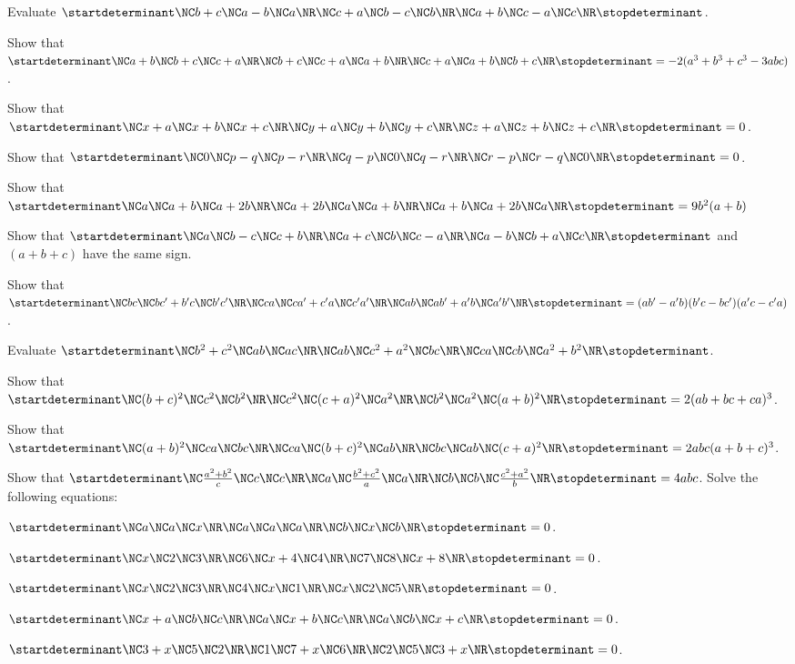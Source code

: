 \item Evaluate $\startdeterminant\NC  b + c \NC a - b \NC a\NR\NC c + a \NC b - c \NC b\NR\NC a + b \NC c - a \NC c\NR\stopdeterminant$.
\item Show that $\startdeterminant\NC  a + b \NC b + c \NC c + a\NR\NC b + c \NC c + a \NC a + b\NR\NC c + a \NC a + b \NC b + c\NR\stopdeterminant = -2(a^3 + b^3 +
  c^3 - 3abc)$.
\item Show that $\startdeterminant\NC  x + a \NC x + b \NC x + c\NR\NC y + a \NC y + b \NC y + c\NR\NC z + a\NC z + b \NC z + c\NR\stopdeterminant = 0$.
\item Show that $\startdeterminant\NC  0 \NC p - q \NC p - r\NR\NC  q - p \NC 0 \NC q - r\NR\NC  r - p \NC r - q \NC 0\NR\stopdeterminant = 0$.
\item Show that $\startdeterminant\NC  a \NC a + b \NC a + 2b\NR\NC a + 2b \NC a \NC a + b\NR\NC a + b \NC a + 2b \NC a\NR\stopdeterminant = 9b^2(a + b)$
\item Show that $\startdeterminant\NC  a \NC b - c \NC c + b\NR\NC  a + c \NC b \NC c - a\NR\NC  a - b \NC b + a \NC c\NR\stopdeterminant$ and $(a + b + c)$ have the
  same sign.
\item Show that $\startdeterminant\NC bc\NC bc' + b'c\NC b'c'\NR\NC ca\NC ca' + c'a \NC c'a'\NR\NC ab\NC ab' + a'b\NC a'b'\NR\stopdeterminant =
  (ab' - a'b)(b'c - bc')(a'c - c'a)$.
\item Evaluate $\startdeterminant\NC  b^2 + c^2 \NC ab \NC ac\NR\NC ab \NC c^2 + a^2 \NC bc\NR\NC ca \NC cb \NC a^2 + b^2\NR\stopdeterminant$.
\item Show that $\startdeterminant\NC  (b + c)^2 \NC c^2 \NC b^2\NR\NC c^2 \NC (c + a)^2 \NC a^2\NR\NC b^2 \NC a^2 \NC (a + b)^2\NR\stopdeterminant = 2(ab + bc +
  ca)^3$.
\item Show that $\startdeterminant\NC  (a + b)^2 \NC ca \NC bc\NR\NC ca \NC (b + c)^2 \NC ab\NR\NC bc \NC ab \NC (c + a)^2\NR\stopdeterminant = 2abc(a + b + c)^3$.
\item Show that $\startdeterminant\NC  \frac{a^2 + b^2}{c} \NC c \NC c\NR\NC a \NC \frac{b^2 + c^2}{a} \NC a\NR\NC b \NC b \NC \frac{c^2 + a^2}{b}\NR\stopdeterminant
  = 4abc$.
\stopitemize
Solve the following equations:

\item $\startdeterminant\NC  a \NC a \NC x \NR\NC  a \NC a \NC a \NR\NC  b \NC x \NC b\NR\stopdeterminant = 0$.
\item $\startdeterminant\NC  x \NC 2 \NC 3\NR\NC 6 \NC x + 4 \NC 4\NR\NC 7 \NC 8 \NC x + 8\NR\stopdeterminant = 0$.
\item $\startdeterminant\NC  x \NC 2 \NC 3\NR\NC  4 \NC x \NC 1\NR\NC  x \NC 2 \NC 5\NR\stopdeterminant = 0$.
\item $\startdeterminant\NC  x + a \NC b \NC c\NR\NC  a \NC x + b \NC c\NR\NC  a \NC b \NC x + c\NR\stopdeterminant = 0$.
\item $\startdeterminant\NC  3 + x \NC 5 \NC 2 \NR\NC  1 \NC 7 + x \NC 6 \NR\NC  2 \NC 5 \NC 3 + x\NR\stopdeterminant = 0$.
\stopitemize

